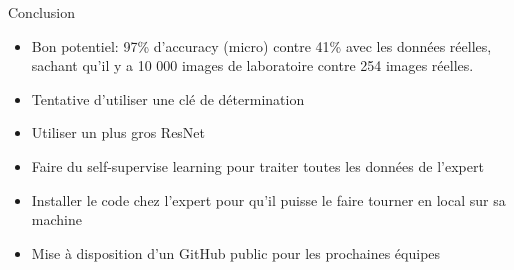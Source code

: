\documentclass[11pt]{beamer}
\begin{document}
\begin{frame}{Conclusion}
    \begin{itemize}
        \item Bon potentiel: 97\% d'accuracy (micro) contre 41\% avec les données réelles, sachant qu'il y a 10 000 images de laboratoire contre 254 images réelles.
        \item Tentative d'utiliser une clé de détermination
        \item Utiliser un plus gros ResNet
        \item Faire du self-supervise learning pour traiter toutes les données de l'expert
        \item Installer le code chez l'expert pour qu'il puisse le faire tourner en local sur sa machine
        \item Mise à disposition d'un GitHub public pour les prochaines équipes
    \end{itemize}
\end{frame}
\end{document}

